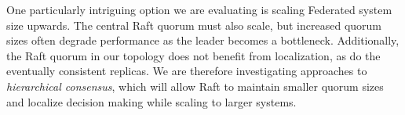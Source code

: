 \documentclass[10pt,conference,letterpaper]{IEEEtran}
\begin{document}
One particularly intriguing option we are evaluating is scaling Federated system size
upwards.
The central Raft quorum must also scale, but increased quorum sizes often degrade
performance as the leader becomes a bottleneck.
Additionally, the Raft quorum in our topology does not benefit from localization, as do
the eventually consistent replicas.
We are therefore investigating approaches to \emph{hierarchical consensus}, which will
allow Raft to maintain smaller quorum sizes and localize decision making while scaling to
larger systems.

%

\newpage


\end{document}
